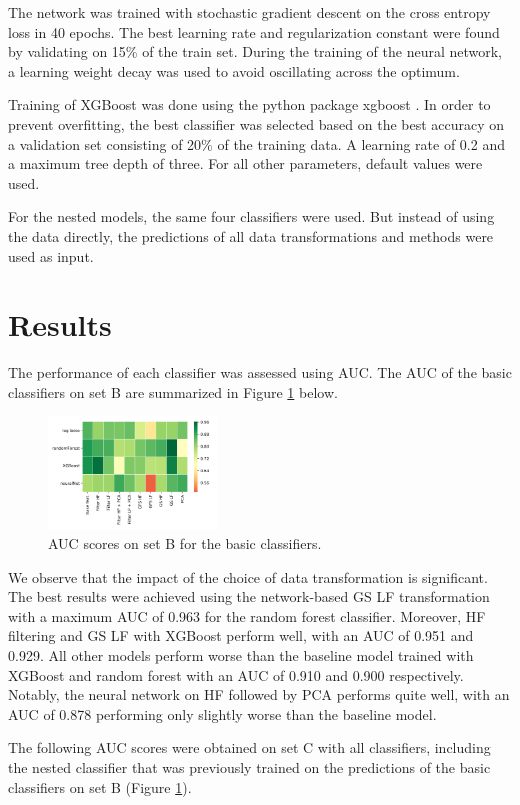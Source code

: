 \documentclass[10pt,conference,compsocconf]{IEEEtran}
\begin{document}
The network was trained with stochastic gradient descent on the cross entropy loss in 40 epochs. The best learning rate and regularization constant were found by validating on 15\% of the train set. During the training of the neural network, a learning weight decay was used to avoid oscillating across the optimum.
\par
Training of XGBoost was done using the python package xgboost \cite{Chen:2016:XST:2939672.2939785}. In order to prevent overfitting, the best classifier was selected based on the best  accuracy on a validation set consisting of 20\% of the training data. A learning rate of 0.2 and a maximum tree depth of three. For all other parameters, default values were used.
\par
For the nested models, the same four classifiers were used. But instead of using the data directly, the predictions of all data transformations and methods were used as input.

\section*{Results}
The performance of each classifier was assessed using AUC.
The AUC of the basic classifiers on set B are summarized in Figure \ref{fig:train_acc} below.
\begin{figure}[H]
	\centering
	\includegraphics[width=0.4\textwidth]{train_auc.png}
	\caption{AUC scores on set B for the basic classifiers.}
	\label{fig:train_acc}
\end{figure}
We observe that the impact of the choice of data transformation is significant.
The best results were achieved using the network-based GS LF transformation with a maximum AUC of 0.963 for the random forest classifier. Moreover, HF filtering and GS LF with XGBoost perform well, with an AUC of 0.951 and 0.929. All other models perform worse than the baseline model trained with XGBoost and random forest with an AUC of 0.910 and 0.900 respectively. Notably, the neural network on HF followed by PCA performs quite well, with an AUC of 0.878 performing only slightly worse than the baseline model.
\par  
The following AUC scores were obtained on set C with all classifiers, including the nested classifier that was previously trained on the predictions of the basic classifiers on set B (Figure \ref{fig:train_acc}).
\end{document}

